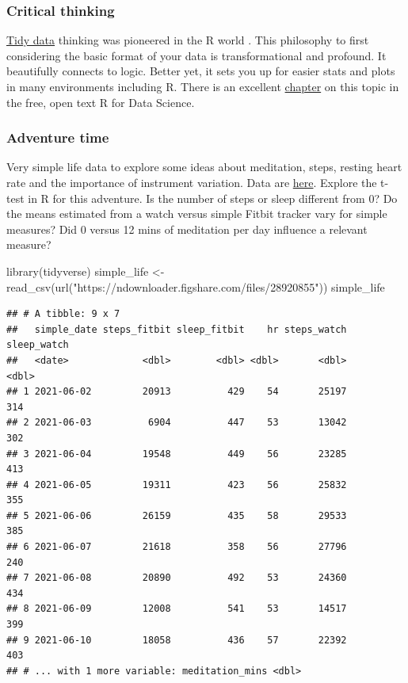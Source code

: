 \documentclass[
]{book}
\newenvironment{Shaded}{\begin{snugshade}}{\end{snugshade}}
\newcommand{\FunctionTok}[1]{\textcolor[rgb]{0.00,0.00,0.00}{#1}}
\newcommand{\NormalTok}[1]{#1}
\newcommand{\OtherTok}[1]{\textcolor[rgb]{0.56,0.35,0.01}{#1}}
\newcommand{\StringTok}[1]{\textcolor[rgb]{0.31,0.60,0.02}{#1}}
\begin{document}
\hypertarget{critical-thinking}{%
\subsubsection*{Critical thinking}\label{critical-thinking}}

\href{https://www.jstatsoft.org/article/view/v059i10}{Tidy data} thinking was pioneered in the R world \citep{RN4416}. This philosophy to first considering the basic format of your data is transformational and profound. It beautifully connects to logic. Better yet, it sets you up for easier stats and plots in many environments including R. There is an excellent \href{https://r4ds.had.co.nz/tidy-data.html}{chapter} on this topic in the free, open text R for Data Science.

\hypertarget{adventure-time}{%
\subsubsection*{Adventure time}\label{adventure-time}}

Very simple life data to explore some ideas about meditation, steps, resting heart rate and the importance of instrument variation. Data are \href{https://figshare.com/articles/dataset/Simple_health_data/15040515}{here}. Explore the t-test in R for this adventure. Is the number of steps or sleep different from 0? Do the means estimated from a watch versus simple Fitbit tracker vary for simple measures? Did 0 versus 12 mins of meditation per day influence a relevant measure?

\begin{Shaded}
\begin{Highlighting}[]
\FunctionTok{library}\NormalTok{(tidyverse)}
\NormalTok{simple\_life }\OtherTok{\textless{}{-}} \FunctionTok{read\_csv}\NormalTok{(}\FunctionTok{url}\NormalTok{(}\StringTok{"https://ndownloader.figshare.com/files/28920855"}\NormalTok{))}
\NormalTok{simple\_life}
\end{Highlighting}
\end{Shaded}

\begin{verbatim}
## # A tibble: 9 x 7
##   simple_date steps_fitbit sleep_fitbit    hr steps_watch sleep_watch
##   <date>             <dbl>        <dbl> <dbl>       <dbl>       <dbl>
## 1 2021-06-02         20913          429    54       25197         314
## 2 2021-06-03          6904          447    53       13042         302
## 3 2021-06-04         19548          449    56       23285         413
## 4 2021-06-05         19311          423    56       25832         355
## 5 2021-06-06         26159          435    58       29533         385
## 6 2021-06-07         21618          358    56       27796         240
## 7 2021-06-08         20890          492    53       24360         434
## 8 2021-06-09         12008          541    53       14517         399
## 9 2021-06-10         18058          436    57       22392         403
## # ... with 1 more variable: meditation_mins <dbl>
\end{verbatim}
\end{document}
